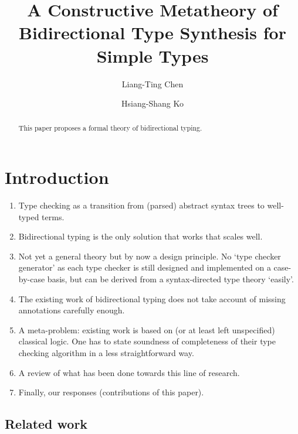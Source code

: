 \documentclass[acmsmall,screen]{acmart}
\theoremstyle{acmdefinition}
\begin{document}
\author{Liang-Ting Chen}
\author{Hsiang-Shang Ko}


\title{A Constructive Metatheory of Bidirectional Type Synthesis for Simple Types}

\begin{abstract}
  This paper proposes a formal theory of bidirectional typing.
\end{abstract}

\maketitle

\section{Introduction}\label{sec:intro}

\begin{enumerate}
  \item Type checking as a transition from (parsed) abstract syntax trees to well-typed terms.
  \item Bidirectional typing is the only solution that works that scales well.
  \item Not yet a general theory but by now a design principle.
    No `type checker generator' as each type checker is still designed and implemented on a case-by-case basis, but can be derived from a syntax-directed type theory `easily'.
  \item The existing work of bidirectional typing does not take account of missing annotations carefully enough. 
  \item A meta-problem: existing work is based on (or at least left unspecified) classical logic.
    One has to state soundness of completeness of their type checking algorithm in a less straightforward way.
  \item A review of what has been done towards this line of research.
  \item Finally, our responses (contributions of this paper).
\end{enumerate}

\subsection{Related work}
\end{document}
